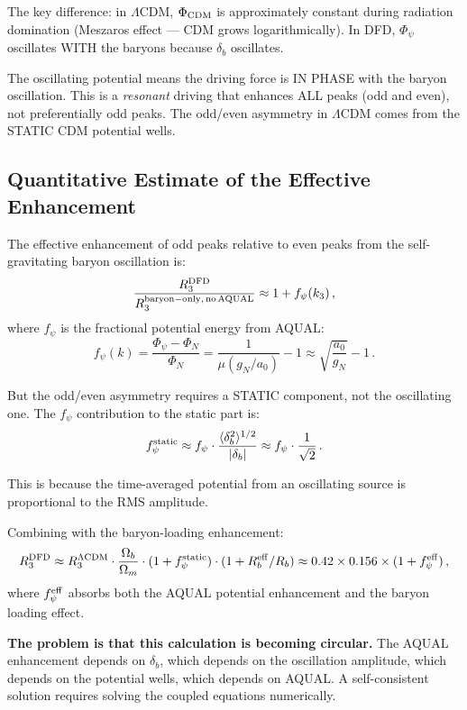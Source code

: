 \documentclass[11pt]{article}
\newcommand{\LCDM}{$\Lambda$CDM}
\newcommand{\aM}{a_0}
\newcommand{\Ob}{\Omega_b}
\newcommand{\Om}{\Omega_m}
\begin{document}
The key difference: in \LCDM, $\Phi_{\rm CDM}$ is approximately constant
during radiation domination (Meszaros effect --- CDM grows logarithmically).
In DFD, $\Phi_\psi$ oscillates WITH the baryons because $\delta_b$ oscillates.

The oscillating potential means the driving force is IN PHASE with the
baryon oscillation.  This is a \emph{resonant} driving that enhances ALL
peaks (odd and even), not preferentially odd peaks.  The odd/even asymmetry
in \LCDM{} comes from the STATIC CDM potential wells.

\subsection{Quantitative Estimate of the Effective Enhancement}

The effective enhancement of odd peaks relative to even peaks from the
self-gravitating baryon oscillation is:
\begin{equation}
\frac{R_3^{\rm DFD}}{R_3^{\rm baryon-only,\,no\,AQUAL}}
\approx 1 + f_\psi(k_3)\,,
\end{equation}
where $f_\psi$ is the fractional potential energy from AQUAL:
\begin{equation}
f_\psi(k) = \frac{\Phi_\psi - \Phi_N}{\Phi_N}
= \frac{1}{\mu(g_N/\aM)} - 1
\approx \sqrt{\frac{\aM}{g_N}} - 1\,.
\end{equation}

But the odd/even asymmetry requires a STATIC component, not the oscillating
one.  The $f_\psi$ contribution to the static part is:
\begin{equation}
f_\psi^{\rm static} \approx f_\psi\cdot\frac{\langle\delta_b^2\rangle^{1/2}}
{|\delta_b|} \approx f_\psi\cdot\frac{1}{\sqrt{2}}\,.
\end{equation}

This is because the time-averaged potential from an oscillating source
is proportional to the RMS amplitude.

Combining with the baryon-loading enhancement:
\begin{equation}
R_3^{\rm DFD} \approx R_3^{\Lambda\rm CDM}\cdot\frac{\Ob}{\Om}
\cdot(1 + f_\psi^{\rm static})\cdot(1 + R_b^{\rm eff}/R_b)
\approx 0.42\times 0.156\times(1 + f_\psi^{\rm eff})\,,
\end{equation}
where $f_\psi^{\rm eff}$ absorbs both the AQUAL potential enhancement and the
baryon loading effect.

\textbf{The problem is that this calculation is becoming circular.}  The
AQUAL enhancement depends on $\delta_b$, which depends on the oscillation
amplitude, which depends on the potential wells, which depends on AQUAL.
A self-consistent solution requires solving the coupled equations
numerically.
\end{document}
